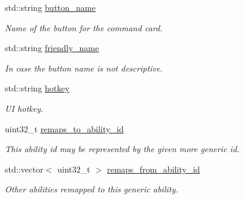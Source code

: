 \begin{DoxyCompactItemize}
std\+::string \hyperlink{structsc2_1_1_ability_data_a866b35972f5337e031215963d5fca922}{button\+\_\+name}
\begin{DoxyCompactList}\small\item\em Name of the button for the command card. \end{DoxyCompactList}\item 
\mbox{\label{structsc2_1_1_ability_data_a9d7420bdffeed5e35f28abb9d397b0de}} 
std\+::string \hyperlink{structsc2_1_1_ability_data_a9d7420bdffeed5e35f28abb9d397b0de}{friendly\+\_\+name}
\begin{DoxyCompactList}\small\item\em In case the button name is not descriptive. \end{DoxyCompactList}\item 
\mbox{\label{structsc2_1_1_ability_data_a5e8389aab78797e9e8f4f88150ba6a76}} 
std\+::string \hyperlink{structsc2_1_1_ability_data_a5e8389aab78797e9e8f4f88150ba6a76}{hotkey}
\begin{DoxyCompactList}\small\item\em UI hotkey. \end{DoxyCompactList}\item 
\mbox{\label{structsc2_1_1_ability_data_a26ac48da5fd45e38e541250294438bb4}} 
uint32\+\_\+t \hyperlink{structsc2_1_1_ability_data_a26ac48da5fd45e38e541250294438bb4}{remaps\+\_\+to\+\_\+ability\+\_\+id}
\begin{DoxyCompactList}\small\item\em This ability id may be represented by the given more generic id. \end{DoxyCompactList}\item 
\mbox{\label{structsc2_1_1_ability_data_a94d9523f96fc6497b46fa2d1355e03b5}} 
std\+::vector$<$ uint32\+\_\+t $>$ \hyperlink{structsc2_1_1_ability_data_a94d9523f96fc6497b46fa2d1355e03b5}{remaps\+\_\+from\+\_\+ability\+\_\+id}
\begin{DoxyCompactList}\small\item\em Other abilities remapped to this generic ability. \end{DoxyCompactList}\item 
\mbox{\label{structsc2_1_1_ability_data_a2351270150739e40d945e21fb801bedf}} 

\end{DoxyCompactItemize}
